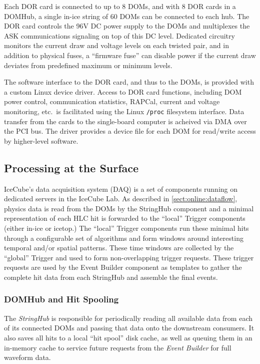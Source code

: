 Each DOR card is connected to up to 8 DOMs, and with 8 DOR cards in a
DOMHub, a single in-ice string of 60 DOMs can be connected to each hub. The
DOR card controls the 96V DC power supply to the DOMs and multiplexes the
ASK communications signaling on top of this DC level.  Dedicated circuitry
monitors the current draw and voltage levels on each twisted pair, and in
addition to physical fuses, a ``firmware fuse'' can disable power if the
current draw deviates from predefined maximum or minimum levels.

The software interface to the DOR card, and thus to the DOMs, is provided
with a custom Linux device driver.  Access to DOR card functions,
including DOM power control, communication statistics, RAPCal, current and
voltage monitoring, etc.~is facilitated using the Linux \texttt{/proc}
filesystem interface.  Data transfer from the cards to the single-board
computer is acheived via DMA over the PCI bus.  The driver provides a
device file for each DOM for read/write access by higher-level software.

\subsection{Processing at the Surface}

IceCube's data acquisition system (DAQ) is a set of components running on
dedicated servers in the IceCube Lab.  As described in \ref{sect:online:dataflow}, physics data is read from the DOMs by the StringHub
component and a minimal representation of each HLC hit is forwarded to the
``local'' Trigger components (either in-ice or icetop.)
The ``local'' Trigger components run these
minimal hits through a configurable set of algorithms and form windows around
interesting temporal and/or spatial patterns.  These time windows are collected
by the ``global'' Trigger and used to form non-overlapping trigger requests.
These trigger requests are used by the Event Builder component as templates to
gather the complete hit data from each StringHub and assemble the final events.

\subsubsection{DOMHub and Hit Spooling}

The \emph{StringHub} is responsible for periodically reading all available data
from each of its connected DOMs and passing that data onto the downstream
consumers.  It also saves all hits to a local ``hit spool'' disk cache, as
well as queuing them in an in-memory cache to service future requests from
the \emph{Event Builder} for full waveform data.

